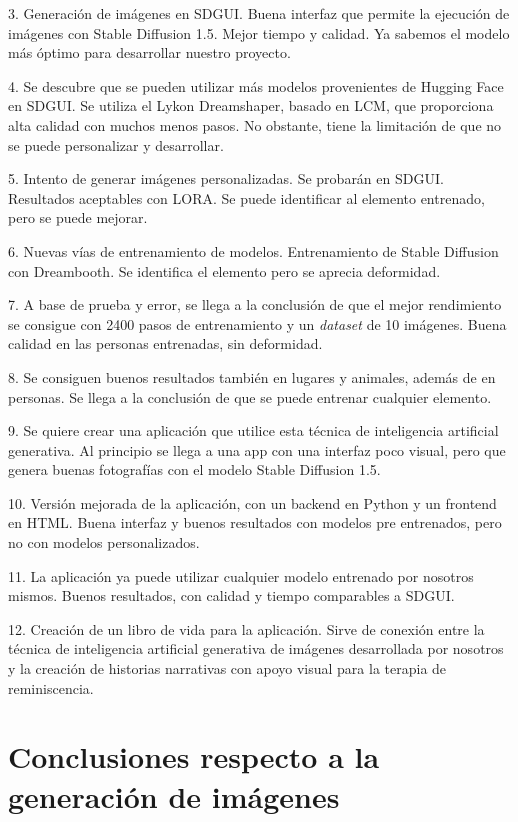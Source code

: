 \begin{itemize}
3. Generación de imágenes en SDGUI. Buena interfaz que permite la ejecución de imágenes con Stable Diffusion 1.5. Mejor tiempo y calidad. Ya sabemos el modelo más óptimo para desarrollar nuestro proyecto.

4. Se descubre que se pueden utilizar más modelos provenientes de Hugging Face en SDGUI. Se utiliza el Lykon Dreamshaper, basado en LCM, que proporciona alta calidad con muchos menos pasos. No obstante, tiene la limitación de que no se puede personalizar y desarrollar.

5. Intento de generar imágenes personalizadas. Se probarán en SDGUI. Resultados aceptables con LORA. Se puede identificar al elemento entrenado, pero se puede mejorar.

6. Nuevas vías de entrenamiento de modelos. Entrenamiento de Stable Diffusion con Dreambooth. Se identifica el elemento pero se aprecia deformidad.

7. A base de prueba y error, se llega a la conclusión de que el mejor rendimiento se consigue con 2400 pasos de entrenamiento y un \textit{dataset} de 10 imágenes. Buena calidad en las personas entrenadas, sin deformidad.

8. Se consiguen buenos resultados también en lugares y animales, además de en personas. Se llega a la conclusión de que se puede entrenar cualquier elemento.

9. Se quiere crear una aplicación que utilice esta técnica de inteligencia artificial generativa. Al principio se llega a una app con una interfaz poco visual, pero que genera buenas fotografías con el modelo Stable Diffusion 1.5.

10. Versión mejorada de la aplicación, con un backend en Python y un frontend en HTML. Buena interfaz y buenos resultados con modelos pre entrenados, pero no con modelos personalizados.

11. La aplicación ya puede utilizar cualquier modelo entrenado por nosotros mismos. Buenos resultados, con calidad y tiempo comparables a SDGUI.

12. Creación de un libro de vida para la aplicación. Sirve de conexión entre la técnica de inteligencia artificial generativa de imágenes desarrollada por nosotros y la creación de historias narrativas con apoyo visual para la terapia de reminiscencia.

\section{Conclusiones respecto a la generación de imágenes}


\end{itemize}
